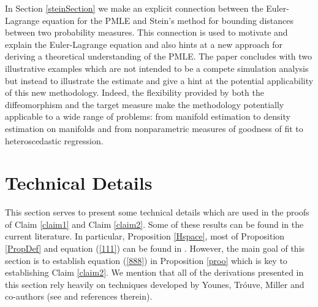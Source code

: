 \documentclass[noinfoline]{imsart}
\begin{document}
In Section \ref{steinSection} we make an explicit connection between the Euler-Lagrange equation for the PMLE and Stein's method for bounding distances between two probability measures.
This connection is used to motivate and explain the Euler-Lagrange equation and also hints at a new approach for deriving a theoretical understanding of the PMLE.
The paper concludes with  two illustrative examples which are not intended to be a compete simulation analysis but instead to illustrate the estimate and give a hint at the potential applicability of this new methodology. Indeed, the flexibility provided by both the diffeomorphism and the target measure make the methodology potentially applicable to a wide range of problems:
from manifold estimation to density estimation on manifolds and from nonparametric measures of goodness of fit to
 heteroscedastic regression.




\appendix



\section{Technical Details}
\label{TD}


This section serves to present some technical details which are used  in the proofs of Claim \ref{claim1} and Claim \ref{claim2}.   Some of these results can be found in the current literature. In particular,  Proposition \ref{Hspace}, most of Proposition \ref{PropDef} and equation (\ref{111}) can be found in \cite{you:10}.   However, the main goal of this section is to establish  equation (\ref{888}) in Proposition \ref{proo}  which is key to establishing Claim \ref{claim2}.
We mention that all of the derivations presented in this section rely heavily on techniques developed by  Younes, Tr\'ouve, Miller and co-authors (see \cite{you:10} and references therein).
\end{document}
